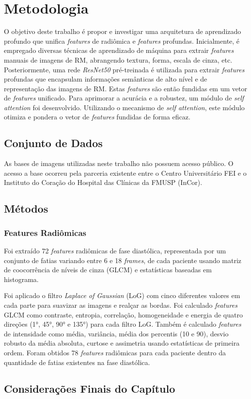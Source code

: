\chapter{Metodologia} 
\label{chap:metodologia}

O objetivo deste trabalho é propor e investigar uma arquitetura de aprendizado profundo que unifica \textit{features} de radiômica e \textit{features} profundas. Inicialmente, é empregado diversas técnicas de aprendizado de máquina para extrair \textit{features} manuais de imagens de RM, abrangendo textura, forma, escala de cinza, etc. Posteriormente, uma rede \textit{ResNet50} pré-treinada é utilizada para extrair \textit{features} profundas que encapsulam informações semânticas de alto nível e de representação das imagens de RM. Estas \textit{features} são então fundidas em um vetor de \textit{features} unificado. Para aprimorar a acurácia e a robustez, um módulo de \textit{self attention} foi desenvolvido. Utilizando o mecanismo de \textit{self attention}, este módulo otimiza e pondera o vetor de \textit{features} fundidas de forma eficaz.

\section{Conjunto de Dados}
As bases de imagens utilizadas neste trabalho não possuem acesso público. O acesso
a base ocorreu pela parceria existente entre o Centro Universitário FEI e o Instituto do Coração do Hospital das Clínicas da FMUSP (InCor).



\section{Métodos}
\label{sec:cap4_metodos}

\subsection{Features Radiômicas}
\label{subsec:cap4_features_radiomicas}

Foi extraído 72 \textit{features} radiômicas de fase diastólica, representada por um conjunto de fatias variando entre 6 e 18 \textit{frames}, de cada paciente usando matriz de coocorrência de níveis de cinza (GLCM) e estatísticas baseadas em histograma. 

Foi aplicado o filtro \textit{Laplace of Gaussian} (LoG) com cinco diferentes valores em cada parte para suavizar as imagens e realçar as bordas. Foi calculado \textit{features} GLCM como contraste, entropia, correlação, homogeneidade e energia de quatro direções (1°, 45°, 90° e 135°) para cada filtro LoG. Também é calculado \textit{features} de intensidade como média, variância, média dos percentis (10 e 90), desvio robusto da média absoluta, curtose e assimetria usando estatísticas de primeira ordem. Foram obtidos 78 \textit{features} radiômicas para cada paciente dentro da quantidade de fatias existentes na fase diastólica.


\section{Considerações Finais do Capítulo}
\label{sec:cap4_consideracoes_finais}

\lipsum[1-4]